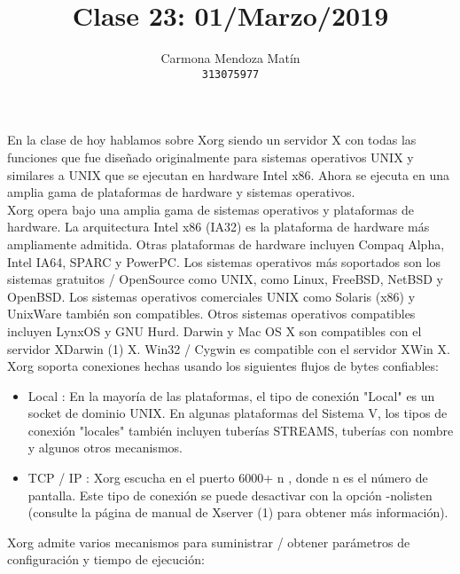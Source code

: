 \documentclass[11pt, a4paper]{report}
\begin{document}
\title{Clase 23: 01/Marzo/2019}
\author{
  Carmona Mendoza Mat\'in\\
  \texttt{313075977}
}
\date{}
\maketitle

En la clase de hoy hablamos sobre Xorg siendo un servidor X con todas las
funciones que fue diseñado originalmente para sistemas operativos UNIX y
similares a UNIX que se ejecutan en hardware Intel x86. Ahora se ejecuta en una
amplia gama de plataformas de hardware y sistemas operativos. \\

Xorg opera bajo una amplia gama de sistemas operativos y plataformas de
hardware. La arquitectura Intel x86 (IA32) es la plataforma de hardware más
ampliamente admitida. Otras plataformas de hardware incluyen Compaq Alpha,
Intel IA64, SPARC y PowerPC. Los sistemas operativos más soportados son los
sistemas gratuitos / OpenSource como UNIX, como Linux, FreeBSD, NetBSD y
OpenBSD. Los sistemas operativos comerciales UNIX como Solaris (x86) y UnixWare
también son compatibles. Otros sistemas operativos compatibles incluyen LynxOS
y GNU Hurd. Darwin y Mac OS X son compatibles con el servidor XDarwin (1) X.
Win32 / Cygwin es compatible con el servidor XWin X. \\

Xorg soporta conexiones hechas usando los siguientes flujos de bytes confiables:

\begin{itemize}
\item Local : En la mayoría de las plataformas, el tipo de conexión "Local" es
  un socket de dominio UNIX. En algunas plataformas del Sistema V, los tipos de
  conexión "locales" también incluyen tuberías STREAMS, tuberías con nombre y
  algunos otros mecanismos.
\item TCP / IP : Xorg escucha en el puerto 6000+ n , donde n es el número de
  pantalla. Este tipo de conexión se puede desactivar con la opción -nolisten
  (consulte la página de manual de Xserver (1) para obtener más información).
\end{itemize}

Xorg admite varios mecanismos para suministrar / obtener parámetros de configuración y tiempo de ejecución:
\end{document}
